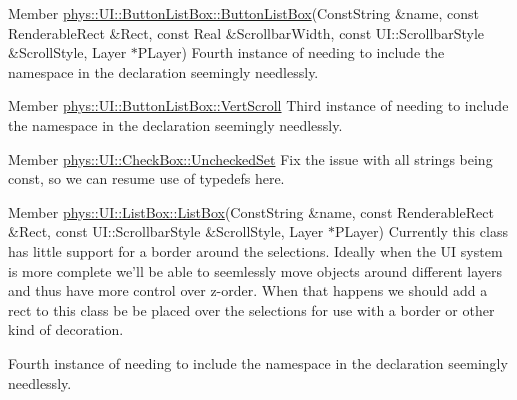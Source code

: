 \label{todo__todo000024}
\hypertarget{todo__todo000024}{}
 
\begin{DoxyDescription}
\item[Member \hyperlink{classphys_1_1UI_1_1ButtonListBox_a43ac98232280969a8ce2641d36658808}{phys::UI::ButtonListBox::ButtonListBox}(ConstString \&name, const RenderableRect \&Rect, const Real \&ScrollbarWidth, const UI::ScrollbarStyle \&ScrollStyle, Layer $\ast$PLayer) ]Fourth instance of needing to include the namespace in the declaration seemingly needlessly. 
\end{DoxyDescription}

\label{todo__todo000025}
\hypertarget{todo__todo000025}{}
 
\begin{DoxyDescription}
\item[Member \hyperlink{classphys_1_1UI_1_1ButtonListBox_aa47d94d75c58e3408a97766eace2c20e}{phys::UI::ButtonListBox::VertScroll} ]Third instance of needing to include the namespace in the declaration seemingly needlessly. 
\end{DoxyDescription}

\label{todo__todo000026}
\hypertarget{todo__todo000026}{}
 
\begin{DoxyDescription}
\item[Member \hyperlink{classphys_1_1UI_1_1CheckBox_a7b670d93f119193283ec78b94f842429}{phys::UI::CheckBox::UncheckedSet} ]Fix the issue with all strings being const, so we can resume use of typedefs here. 
\end{DoxyDescription}

\label{todo__todo000027}
\hypertarget{todo__todo000027}{}
 
\begin{DoxyDescription}
\item[Member \hyperlink{classphys_1_1UI_1_1ListBox_a2c61aa8ff40ff66eb45388a4e6cca5b2}{phys::UI::ListBox::ListBox}(ConstString \&name, const RenderableRect \&Rect, const UI::ScrollbarStyle \&ScrollStyle, Layer $\ast$PLayer) ]Currently this class has little support for a border around the selections. Ideally when the UI system is more complete we'll be able to seemlessly move objects around different layers and thus have more control over z-\/order. When that happens we should add a rect to this class be be placed over the selections for use with a border or other kind of decoration. 

Fourth instance of needing to include the namespace in the declaration seemingly needlessly. 
\end{DoxyDescription}

